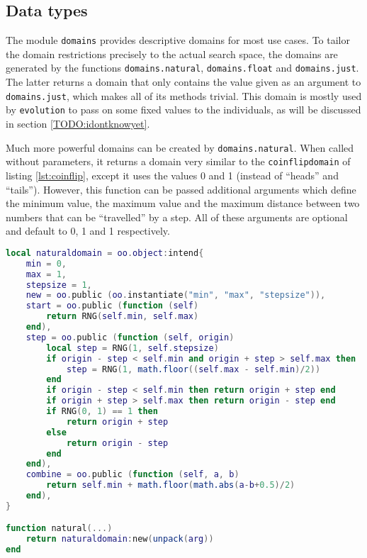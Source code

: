 \subsection{Data types}
\label{sec:evolution:domains:data}

The module \texttt{domains} provides descriptive domains for most use cases. To tailor the domain restrictions precisely to the actual search space, the domains are generated by the functions \texttt{domains.natural}, \texttt{domains.float} and \texttt{domains.just}. The latter returns a domain that only contains the value given as an argument to \texttt{domains.just}, which makes all of its methods trivial. This domain is mostly used by \texttt{evolution} to pass on some fixed values to the individuals, as will be discussed in section \ref{TODO:idontknowyet}.

Much more powerful domains can be created by \texttt{domains.natural}. When called without parameters, it returns a domain very similar to the \texttt{coinflipdomain} of listing \ref{lst:coinflip}, except it uses the values 0 and 1 (instead of ``heads'' and ``tails''). However, this function can be passed additional arguments which define the minimum value, the maximum value and the maximum distance between two numbers that can be ``travelled'' by a step. All of these arguments are optional and default to 0, 1 and 1 respectively.

\begin{lstlisting}[language=lua, caption={Defintion of \texttt{domains.natural}}, label=lst:natural, name=lst:natural]
local naturaldomain = oo.object:intend{
    min = 0,
    max = 1,
    stepsize = 1,
    new = oo.public (oo.instantiate("min", "max", "stepsize")),
    start = oo.public (function (self)
        return RNG(self.min, self.max)
    end),
    step = oo.public (function (self, origin)
        local step = RNG(1, self.stepsize)
        if origin - step < self.min and origin + step > self.max then
            step = RNG(1, math.floor((self.max - self.min)/2))
        end
        if origin - step < self.min then return origin + step end
        if origin + step > self.max then return origin - step end
        if RNG(0, 1) == 1 then
            return origin + step
        else
            return origin - step
        end
    end),
    combine = oo.public (function (self, a, b)
        return self.min + math.floor(math.abs(a-b+0.5)/2)
    end),
}

function natural(...)
    return naturaldomain:new(unpack(arg))
end
\end{lstlisting}


